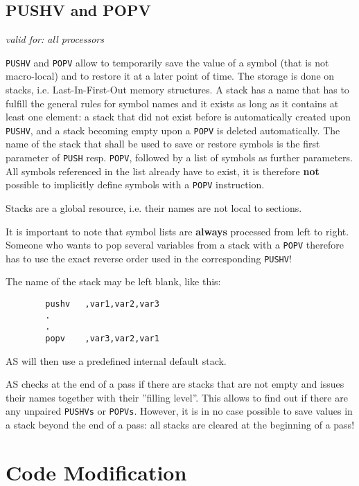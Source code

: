 \documentclass[12pt,twoside]{report}
\makeatletter
\newcommand{\bb}[1]{{\bf #1}}
\newcommand{\tty}[1]{{\tt #1}}
\newcommand{\ttindex}[1]{\index{#1@{\tt #1}}}
\makeatother
\begin{document}

\subsection{PUSHV and POPV}
\ttindex{PUSHV}\ttindex{POPV}

{\em valid for: all processors}

\tty{PUSHV} and \tty{POPV} allow to temporarily save the value of a symbol
(that is not macro-local) and to restore it at a later point of time.  The
storage is done on stacks, i.e. Last-In-First-Out memory structures.  A
stack has a name that has to fulfill the general rules for symbol names
and it exists as long as it contains at least one element: a stack that
did not exist before is automatically created upon \tty{PUSHV}, and a
stack becoming empty upon a \tty{POPV} is deleted automatically.  The name
of the stack that shall be used to save or restore symbols is the first
parameter of \tty{PUSH} resp. \tty{POPV}, followed by a list of symbols as
further parameters.  All symbols referenced in the list already have to
exist, it is therefore \bb{not} possible to implicitly define symbols with
a \tty{POPV} instruction.

Stacks are a global resource, i.e. their names are not local to
sections.

It is important to note that symbol lists are \bb{always} processed from
left to right.  Someone who wants to pop several variables from a stack
with a \tty{POPV} therefore has to use the exact reverse order used in the
corresponding \tty{PUSHV}!

The name of the stack may be left blank, like this:
\begin{verbatim}
        pushv   ,var1,var2,var3
        .
        .
        popv    ,var3,var2,var1
\end{verbatim}
AS will then use a predefined internal default stack.

AS checks at the end of a pass if there are stacks that are not empty and
issues their names together with their ''filling level''.  This allows to
find out if there are any unpaired \tty{PUSHVs} or \tty{POPVs}.  However,
it is in no case possible to save values in a stack beyond the end of a
pass: all stacks are cleared at the beginning of a pass!


\section{Code Modification}
\end{document}
